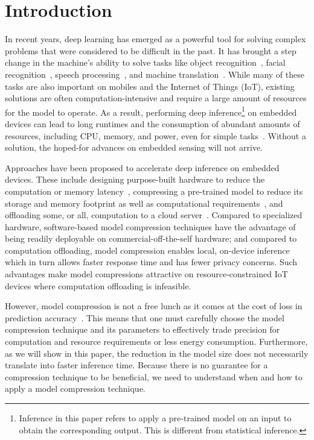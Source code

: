 \section{Introduction}
In recent years, deep learning has emerged as a powerful tool for solving complex problems that were considered to be difficult in the
past. It has brought a step change in the machine's ability to solve tasks like object recognition~\cite{donahue14,he2016deep}, facial
recognition~\cite{parkhi2015deep,sun2014deep}, speech processing~\cite{pmlrv48amodei16}, and machine translation~\cite{bahdanau2014neural}.
While many of these tasks are also important on mobiles and the Internet of Things (IoT), existing solutions are often
computation-intensive and require a large amount of resources for the model to operate. As a result, performing deep
inference\footnote{Inference in this paper refers to apply a pre-trained model on an input to obtain the corresponding output. This is
different from statistical inference.} on embedded devices can lead to long runtimes and the consumption of abundant amounts of resources,
including CPU, memory, and power, even for simple tasks~\cite{CanzianiPC16}. Without a solution,
 the hoped-for advances on embedded sensing will not arrive.


Approaches have been proposed to accelerate deep inference on embedded devices. These include designing purpose-built hardware to reduce
the computation or memory latency~\cite{georgiev2017low}, compressing a pre-trained model to reduce its storage and memory footprint as
well as computational requirements~\cite{han2016eie}, and offloading some, or all, computation to a cloud
server~\cite{Kang2017neurosurgeon,teerapittayanon2017distributed}. Compared to specialized hardware, software-based model compression
techniques have the advantage of being readily deployable on commercial-off-the-self hardware; and compared to computation offloading,
model compression enables local, on-device inference which in turn allows faster response time and has fewer privacy concerns. Such
advantages make model compressions attractive on resource-constrained IoT devices where computation offloading is infeasible.


However, model compression is not a free lunch as it comes at the cost of loss in prediction accuracy~\cite{Cheng2017A}. This
means that one must carefully choose the model compression technique and its parameters to effectively trade precision for computation and
resource requirements or less energy consumption. Furthermore, as we will show in this paper, the reduction in the model size does not
necessarily translate into faster inference time. Because there is no guarantee for a compression technique to be beneficial, we need to
understand when and how to apply a model compression technique.

